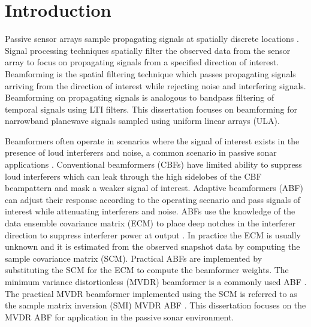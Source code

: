 \chapter{Introduction}
\label{cha:introduction}
Passive sensor arrays sample propagating signals at spatially discrete
locations \cite{vtree2002oap,johnson1992array}. Signal processing
techniques spatially filter the observed data from the sensor
array to focus on propagating signals from a specified direction of
interest. Beamforming is the spatial filtering technique which passes
propagating signals arriving from the direction of interest while
rejecting noise and interfering signals. Beamforming on propagating
signals is analogous to bandpass filtering of temporal signals using
LTI filters. This dissertation focuses on beamforming for narrowband
planewave signals sampled using uniform linear arrays (ULA).

Beamformers often operate in scenarios where the signal of interest
exists in the presence of loud interferers and noise, a common
scenario in passive sonar applications \cite{baggeroer1999passive,
  song2003null}. Conventional beamformers (CBFs) have limited ability
to suppress loud interferers which can leak through the high sidelobes
of the CBF beampattern and mask a weaker signal of interest. Adaptive
beamformers (ABF) can adjust their response according to the operating
scenario and pass signals of interest while attenuating interferers
and noise. ABFs use the knowledge of the data ensemble covariance
matrix (ECM) to place deep notches in the interferer direction to
suppress interferer power at output \cite{vtree2002oap}. In practice
the ECM is usually unknown and it is estimated from the observed
snapshot data by computing the sample covariance matrix
(SCM). Practical ABFs are implemented by substituting the SCM for the
ECM to compute the beamformer weights. The minimum variance distortionless
(MVDR) beamformer is a commonly used ABF \cite{capon1969mvdr}. The
practical MVDR beamformer implemented using the SCM is referred to as
the sample matrix inversion (SMI) MVDR ABF \cite{vtree2002oap}. This
dissertation focuses on the MVDR ABF for application in the passive sonar
environment.


